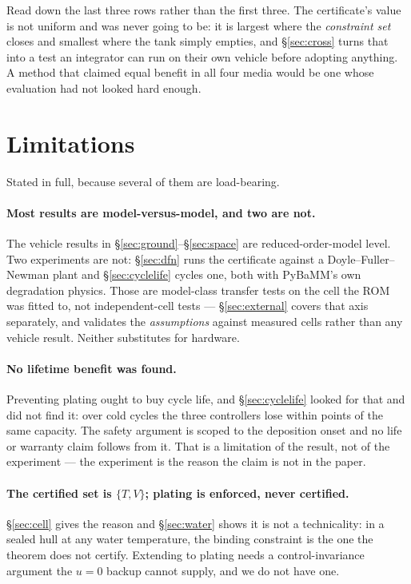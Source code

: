 \documentclass[11pt,letterpaper]{article}
\theoremstyle{definition}
\theoremstyle{remark}
\begin{document}
Read down the last three rows rather than the first three. The certificate's value is not
uniform and was never going to be: it is largest where the \emph{constraint set} closes and
smallest where the tank simply empties, and \S\ref{sec:cross} turns that into a test an
integrator can run on their own vehicle before adopting anything. A method that claimed equal
benefit in all four media would be one whose evaluation had not looked hard enough.


\section{Limitations}\label{sec:limits}

Stated in full, because several of them are load-bearing.

\paragraph{Most results are model-versus-model, and two are not.} The vehicle results in
\S\ref{sec:ground}--\S\ref{sec:space} are reduced-order-model level. Two experiments are not:
\S\ref{sec:dfn} runs the certificate against a Doyle--Fuller--Newman plant and \S\ref{sec:cyclelife}
cycles one, both with PyBaMM's own degradation physics. Those are model-class transfer tests on
the cell the ROM was fitted to, not independent-cell tests --- \S\ref{sec:external} covers that
axis separately, and validates the \emph{assumptions} against measured cells rather than any
vehicle result. Neither substitutes for hardware.

\paragraph{No lifetime benefit was found.} Preventing plating ought to buy cycle life, and
\S\ref{sec:cyclelife} looked for that and did not find it: over \clCycles{} cold cycles the three
controllers lose within \clSpread{} points of the same capacity. The safety argument is scoped to
the deposition onset and no life or warranty claim follows from it. That is a limitation of the
result, not of the experiment --- the experiment is the reason the claim is not in the paper.

\paragraph{The certified set is $\{T, V\}$; plating is enforced, never certified.}
\S\ref{sec:cell} gives the reason and \S\ref{sec:water} shows it is not a technicality: in a
sealed hull at any water temperature, the binding constraint is the one the theorem does not
certify. Extending to plating needs a control-invariance argument the $u=0$ backup cannot
supply, and we do not have one.
\end{document}
